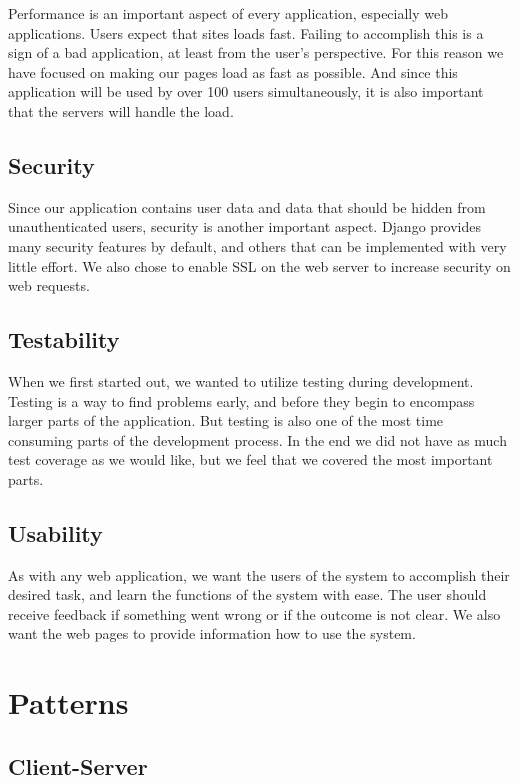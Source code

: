 Performance is an important aspect of every application, especially web
applications. Users expect that sites loads fast. Failing to accomplish
this is a sign of a bad application, at least from the
user's perspective. For this reason we have focused on
making our pages load as fast as possible. And since this application
will be used by over 100 users simultaneously, it is also important
that the servers will handle the load. \ 

\subsection{Security}

Since our application contains user data and data that should be hidden
from unauthenticated users, security is another important aspect.
Django provides many security features by default, and others that can
be implemented with very little effort. We also chose to enable SSL on
the web server to increase security on web requests.

\subsection{Testability}

When we first started out, we wanted to utilize testing during
development. Testing is a way to find problems early, and before they
begin to encompass larger parts of the application. But testing is also
one of the most time consuming parts of the development process. In the
end we did not have as much test coverage as we would like, but we feel
that we covered the most important parts.

\subsection{Usability}

As with any web application, we want the users of the system to
accomplish their desired task, and learn the functions of the system
with ease. The user should receive feedback if something went wrong or
if the outcome is not clear. We also want the web pages to provide
information how to use the system. \ 

\section{Patterns}

\subsection{Client-Server}

